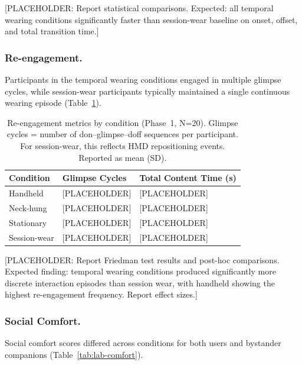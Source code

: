 [PLACEHOLDER: Report statistical comparisons. Expected: all temporal wearing conditions significantly faster than session-wear baseline on onset, offset, and total transition time.]

\subsubsection{Re-engagement.}
Participants in the temporal wearing conditions engaged in multiple glimpse cycles, while session-wear participants typically maintained a single continuous wearing episode (Table~\ref{tab:lab-reengagement}).

\begin{table}[t]
\centering
\caption{Re-engagement metrics by condition (Phase~1, N=20). Glimpse cycles = number of don--glimpse--doff sequences per participant. For session-wear, this reflects HMD repositioning events. Reported as mean (SD).}
\label{tab:lab-reengagement}
\begin{tabular}{p{2.2cm} p{2.2cm} p{2.5cm}}
\toprule
\textbf{Condition} & \textbf{Glimpse Cycles} & \textbf{Total Content Time (s)} \\
\midrule
Handheld & [PLACEHOLDER] & [PLACEHOLDER] \\
Neck-hung & [PLACEHOLDER] & [PLACEHOLDER] \\
Stationary & [PLACEHOLDER] & [PLACEHOLDER] \\
Session-wear & [PLACEHOLDER] & [PLACEHOLDER] \\
\bottomrule
\end{tabular}
\end{table}

[PLACEHOLDER: Report Friedman test results and post-hoc comparisons. Expected finding: temporal wearing conditions produced significantly more discrete interaction episodes than session wear, with handheld showing the highest re-engagement frequency. Report effect sizes.]

\subsubsection{Social Comfort.}
Social comfort scores differed across conditions for both users and bystander companions (Table~\ref{tab:lab-comfort}).

